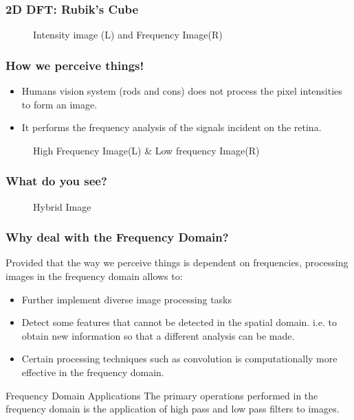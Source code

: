 \documentclass[compress]{beamer}
\begin{document}
  \begin{frame}
    \frametitle{2D DFT: Rubik's Cube}

    \begin{figure}[H]
      \centering
      \caption{Intensity image (L) and Frequency Image(R)}
    \end{figure}
    
  \end{frame}

  \begin{frame}
    \frametitle{How we perceive things!}

    \begin{itemize}
      \item Humans vision system (rods and cons) does not process the pixel
        intensities to form an image.
        
      \item It performs the frequency analysis of the signals incident on the
        retina.

    \end{itemize}

    \begin{figure}[H]
      \centering
      \caption{High Frequency Image(L) \& Low frequency Image(R)}
      \label{fig:}
    \end{figure}
    
  \end{frame}

  \begin{frame}
    \frametitle{What do you see?}

    \begin{figure}[H]
      \centering
      \caption{Hybrid Image}
      \label{fig:-images-hybrid_image-png}
    \end{figure}

  \end{frame}

  \begin{frame}
    \frametitle{Why deal with the Frequency Domain?}

    Provided that the way we perceive things is dependent on frequencies,
    processing images in the frequency domain allows to: \vskip 10pt

    \begin{itemize}
      \item Further implement diverse image processing tasks \vskip 10pt
      \item Detect some features that cannot be detected in the spatial domain.
        i.e. to obtain new information so that a different analysis can be
        made. \vskip 10pt
      \item Certain processing techniques such as convolution is
        computationally more effective in the frequency domain.
    \end{itemize}

    \begin{block}{Frequency Domain Applications}
      The primary operations performed in the frequency domain is the
      application of high pass and low pass filters to images.
    \end{block}

  \end{frame}
\end{document}
